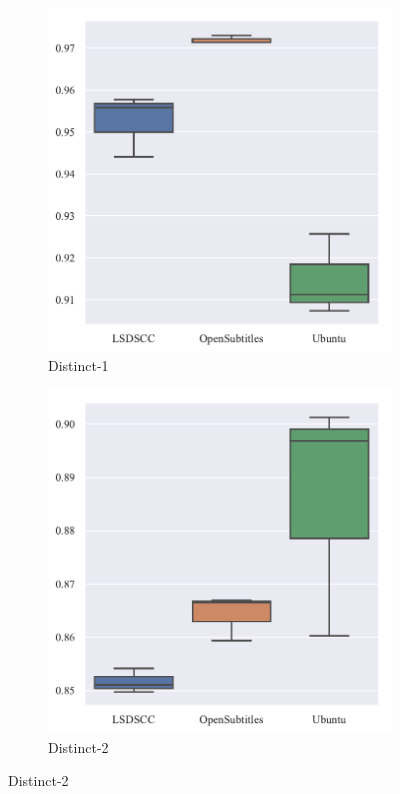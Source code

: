 \begin{figure}[H]
    \begin{subfigure}{0.5\linewidth}
        \centering
        \includegraphics[width=\linewidth]{figure/boxplot/dataset/distinct_1/plot.pdf}
        \caption{Distinct-1}
        \label{fig:distinct_1_system}
    \end{subfigure}%
    \begin{subfigure}{0.5\linewidth}
        \centering
        \includegraphics[width=\linewidth]{figure/boxplot/dataset/distinct_2/plot.pdf}
        \caption{Distinct-2}
        \label{fig:distinct_2_system}
    \end{subfigure}


\end{figure}
